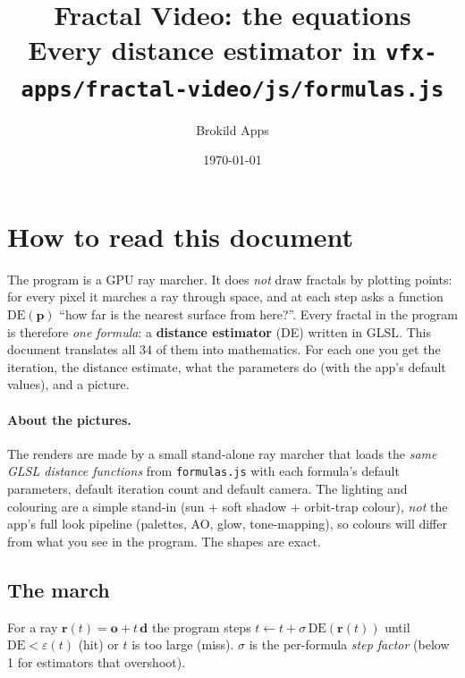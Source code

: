 \documentclass[10pt,a4paper]{article}
\title{\textbf{Fractal Video: the equations}\\[2pt]\large Every distance estimator in \texttt{vfx-apps/fractal-video/js/formulas.js}}
\author{Brokild Apps}
\date{\today}
\newcommand{\vv}[1]{\mathbf{#1}}
\newcommand{\DE}{\mathrm{DE}}
\begin{document}
\maketitle
\tableofcontents

\section{How to read this document}

The program is a GPU ray marcher. It does \emph{not} draw fractals by plotting points: for every pixel it
marches a ray through space, and at each step asks a function $\DE(\vv p)$ ``how far is the nearest surface from here?''.
Every fractal in the program is therefore \emph{one formula}: a \textbf{distance estimator} (DE) written in GLSL.
This document translates all 34 of them into mathematics. For each one you get the iteration, the distance estimate, what
the parameters do (with the app's default values), and a picture.

\paragraph{About the pictures.} The renders are made by a small stand-alone ray marcher that loads the \emph{same GLSL distance
functions} from \texttt{formulas.js} with each formula's default parameters, default iteration count and default camera. The
lighting and colouring are a simple stand-in (sun + soft shadow + orbit-trap colour), \emph{not} the app's full look pipeline
(palettes, AO, glow, tone-mapping), so colours will differ from what you see in the program. The shapes are exact.

\subsection{The march}
For a ray $\vv r(t)=\vv o+t\,\vv d$ the program steps $t\leftarrow t+\sigma\,\DE(\vv r(t))$ until $\DE<\varepsilon(t)$ (hit) or $t$ is
too large (miss). $\sigma$ is the per-formula \emph{step factor} (below 1 for estimators that overshoot).
\end{document}
